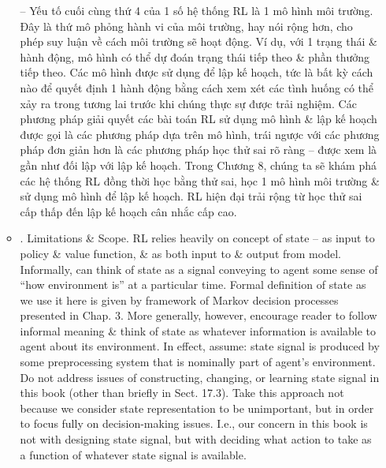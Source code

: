 \documentclass{article}
\begin{document}
\begin{itemize}
\begin{itemize}
        -- Yếu tố cuối cùng thứ 4 của 1 số hệ thống RL là 1 mô hình môi trường. Đây là thứ mô phỏng hành vi của môi trường, hay nói rộng hơn, cho phép suy luận về cách môi trường sẽ hoạt động. Ví dụ, với 1 trạng thái \& hành động, mô hình có thể dự đoán trạng thái tiếp theo \& phần thưởng tiếp theo. Các mô hình được sử dụng để lập kế hoạch, tức là bất kỳ cách nào để quyết định 1 hành động bằng cách xem xét các tình huống có thể xảy ra trong tương lai trước khi chúng thực sự được trải nghiệm. Các phương pháp giải quyết các bài toán RL sử dụng mô hình \& lập kế hoạch được gọi là các phương pháp dựa trên mô hình, trái ngược với các phương pháp đơn giản hơn là các phương pháp học thử sai rõ ràng -- được xem là gần như đối lập với lập kế hoạch. Trong Chương 8, chúng ta sẽ khám phá các hệ thống RL đồng thời học bằng thử sai, học 1 mô hình môi trường \& sử dụng mô hình để lập kế hoạch. RL hiện đại trải rộng từ học thử sai cấp thấp đến lập kế hoạch cân nhắc cấp cao.
        \item {. Limitations \& Scope.} RL relies heavily on concept of state -- as input to policy \& value function, \& as both input to \& output from model. Informally, can think of state as a signal conveying to agent some sense of ``how environment is'' at a particular time. Formal definition of state as we use it here is given by framework of Markov decision processes presented in Chap. 3. More generally, however, encourage reader to follow informal meaning \& think of state as whatever information is available to agent about its environment. In effect, assume: state signal is produced by some preprocessing system that is nominally part of agent's environment. Do not address issues of constructing, changing, or learning state signal in this book (other than briefly in Sect. 17.3). Take this approach not because we consider state representation to be unimportant, but in order to focus fully on decision-making issues. I.e., our concern in this book is not with designing state signal, but with deciding what action to take as a function of whatever state signal is available.


\end{itemize}
\end{itemize}
\end{document}
